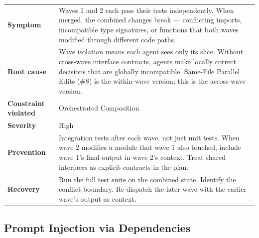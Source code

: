 \documentclass[
  a4paper,
  DIV=11,
  numbers=noendperiod]{scrreprt}
\newcounter{none} %
\begin{document}
{\def\LTcaptype{none} %
\begin{longtable}[]{@{}
  >{\raggedright\arraybackslash}p{}
  >{\raggedright\arraybackslash}p{}@{}}
\toprule\noalign{}
\endhead
\bottomrule\noalign{}
\endlastfoot
\textbf{Symptom} & Waves 1 and 2 each pass their tests independently.
When merged, the combined changes break --- conflicting imports,
incompatible type signatures, or functions that both waves modified
through different code paths. \\
\textbf{Root cause} & Wave isolation means each agent sees only its
slice. Without cross-wave interface contracts, agents make locally
correct decisions that are globally incompatible. Same-File Parallel
Edits (\#8) is the within-wave version; this is the across-wave
version. \\
\textbf{Constraint violated} & Orchestrated Composition \\
\textbf{Severity} & High \\
\textbf{Prevention} & Integration tests after each wave, not just unit
tests. When wave 2 modifies a module that wave 1 also touched, include
wave 1's final output in wave 2's context. Treat shared interfaces as
explicit contracts in the plan. \\
\textbf{Recovery} & Run the full test suite on the combined state.
Identify the conflict boundary. Re-dispatch the later wave with the
earlier wave's output as context. \\
\end{longtable}
}

\subsection{Prompt Injection via
Dependencies}\label{prompt-injection-via-dependencies}
\end{document}
